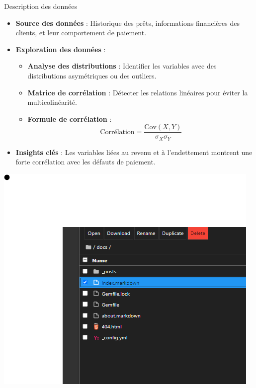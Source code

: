 \documentclass{beamer}
\begin{document}
\begin{frame}{Description des données}
    \begin{itemize}
        \item \textbf{Source des données} : Historique des prêts, informations financières des clients, et leur comportement de paiement.
        \item \textbf{Exploration des données} :
            \begin{itemize}
                \item \textbf{Analyse des distributions} : Identifier les variables avec des distributions asymétriques ou des outliers.
                \item \textbf{Matrice de corrélation} : Détecter les relations linéaires pour éviter la multicolinéarité.
                \item \textbf{Formule de corrélation} :
                \[
                \text{Corrélation} = \frac{\text{Cov}(X, Y)}{\sigma_X \sigma_Y}
                \]
            \end{itemize}
        \item \textbf{Insights clés} : Les variables liées au revenu et à l'endettement montrent une forte corrélation avec les défauts de paiement.
    \end{itemize}
    \includegraphics[width=\textwidth]{assets/test.png} %
\end{frame}
\end{document}
